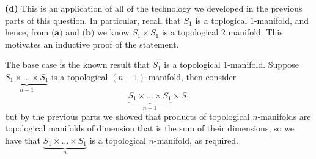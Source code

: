 \documentclass[10pt]{article}
\begin{document}
\textbf{(d)} This is an application of all of the technology we developed in the previous parts of this question. In particular, recall that $S_{1}$ is a toplogical $1$-manifold, and hence, from $\textbf{(a)}$ and $\textbf{(b)}$ we know $S_{1} \times S_{1}$ is a topological $2$ manifold. This motivates an inductive proof of the statement.

The base case is the known result that $S_{1}$ is a topological $1$-manifold. Suppose $\underbrace{S_{1}\times \dots \times S_{1}}_{n-1}$ is a topological $(n-1)$-manifold, then consider
$$\underbrace{S_{1}\times \dots \times S_{1}}_{n-1}\times S_{1}$$
but by the previous parts we showed that products of topological $n$-manifolds are topological manifolds of dimension that is the sum of their dimensions, so we have that $\underbrace{S_{1}\times \dots \times S_{1}}_{n}$ is a topological $n$-manifold, as required.
\end{document}

